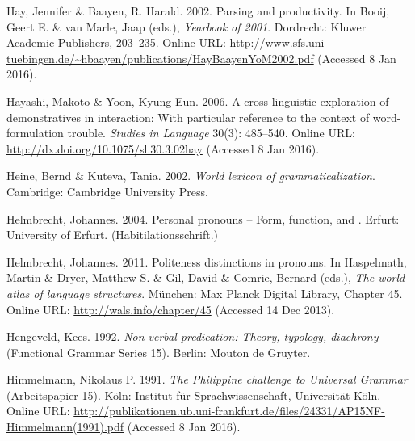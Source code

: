 \begin{styleCitaviBibliographyEntry}
Hay, Jennifer \& Baayen, R. Harald. 2002. Parsing and productivity. In Booij, Geert E. \& van Marle, Jaap (eds.), \textit{Yearbook of  2001}. Dordrecht: Kluwer Academic Publishers, 203–235. Online URL: \url{http://www.sfs.uni-tuebingen.de/~hbaayen/publications/HayBaayenYoM2002.pdf} (Accessed 8 Jan 2016).
\end{styleCitaviBibliographyEntry}

\begin{styleCitaviBibliographyEntry}
Hayashi, Makoto \& Yoon, Kyung-Eun. 2006. A cross-linguistic exploration of demonstratives in interaction: With particular reference to the context of word-formulation trouble. \textit{Studies in Language} 30(3): 485–540. Online URL: \url{http://dx.doi.org/10.1075/sl.30.3.02hay} (Accessed 8 Jan 2016).
\end{styleCitaviBibliographyEntry}

\begin{styleCitaviBibliographyEntry}
Heine, Bernd \& Kuteva, Tania. 2002. \textit{World lexicon of grammaticalization}. Cambridge: Cambridge University Press.
\end{styleCitaviBibliographyEntry}

\begin{styleCitaviBibliographyEntry}
Helmbrecht, Johannes. 2004. Personal pronouns – Form, function, and . Erfurt: University of Erfurt. (Habitilationsschrift.)
\end{styleCitaviBibliographyEntry}

\begin{styleCitaviBibliographyEntry}
Helmbrecht, Johannes. 2011. Politeness distinctions in pronouns. In Haspelmath, Martin \& Dryer, Matthew S. \& Gil, David \& Comrie, Bernard (eds.), \textit{The world atlas of language structures}. München: Max Planck Digital Library, Chapter 45. Online URL: \url{http://wals.info/chapter/45} (Accessed 14 Dec 2013).
\end{styleCitaviBibliographyEntry}

\begin{styleCitaviBibliographyEntry}
Hengeveld, Kees. 1992. \textit{Non-verbal predication: Theory, typology, diachrony} (Functional Grammar Series 15). Berlin: Mouton de Gruyter.
\end{styleCitaviBibliographyEntry}

\begin{styleCitaviBibliographyEntry}
Himmelmann, Nikolaus P. 1991. \textit{The Philippine challenge to Universal Grammar} (Arbeitspapier 15). Köln: Institut für Sprachwissenschaft, Universität Köln. Online URL: \url{http://publikationen.ub.uni-frankfurt.de/files/24331/AP15NF-Himmelmann(1991).pdf} (Accessed 8 Jan 2016).
\end{styleCitaviBibliographyEntry}

